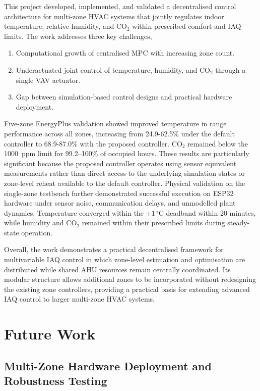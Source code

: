 \documentclass[12pt, a4paper]{article}
\begin{document}
This project developed, implemented, and validated a decentralised control architecture for multi-zone HVAC systems that jointly regulates indoor temperature, relative humidity, and CO$_2$ within prescribed comfort and IAQ limits. The work addresses three key challenges, 
\begin{enumerate}
	\item Computational growth of centralised MPC with increasing zone count.
	\item Underactuated joint control of temperature, humidity, and CO$_2$ through a single VAV actuator.
	\item Gap between simulation-based control designs and practical hardware deployment.
\end{enumerate}

Five-zone EnergyPlus validation showed improved temperature in range performance across all zones, increasing from 24.9-62.5\% under the default controller to 68.9-87.0\% with the proposed controller. CO$_2$ remained below the 1000~ppm limit for 99.2--100\% of occupied hours. These results are particularly significant because the proposed controller operates using sensor equivalent measurements rather than direct access to the underlying simulation states or zone-level reheat available to the default controller. Physical validation on the single-zone testbench further demonstrated successful execution on ESP32 hardware under sensor noise, communication delays, and unmodelled plant dynamics. Temperature converged within the $\pm1\,^\circ$C deadband within 20 minutes, while humidity and CO$_2$ remained within their prescribed limits during steady-state operation.

Overall, the work demonstrates a practical decentralised framework for multivariable IAQ control in which zone-level estimation and optimisation are distributed while shared AHU resources remain centrally coordinated. Its modular structure allows additional zones to be incorporated without redesigning the existing zone controllers, providing a practical basis for extending advanced IAQ control to larger multi-zone HVAC systems.

\newpage
\section{Future Work}

\subsection{Multi-Zone Hardware Deployment and Robustness Testing}
\end{document}
